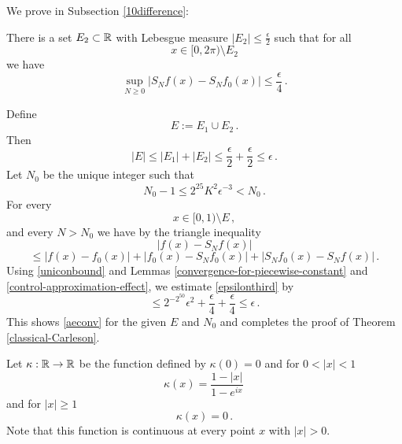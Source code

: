 {We prove in Subsection \ref{10difference}:
\begin{lemma}
\label{control-approximation-effect}
    There is a set $E_2 \subset {\mathbb{R}}$ with Lebesgue measure
    $|E_2|\le \frac \epsilon 2$ such that for all
    \begin{equation}
        x\in [0,2\pi)\setminus E_2
    \end{equation}
   we have
    \begin{equation}
    \label{eq-max-partial-sum-diff}
        \sup_{N\ge 0} |S_Nf(x)-S_Nf_0(x)|
        \le \frac \epsilon 4\,.
    \end{equation}
\end{lemma}

Define
\begin{equation}
    E:=E_1\cup E_2\, .
\end{equation}
Then
\begin{equation}
    |E|\le |E_1|+|E_2|\le \frac \epsilon 2 +\frac \epsilon 2 \le \epsilon\, .
\end{equation}
Let $N_0$ be the unique integer such that
\begin{equation}
    N_0- 1\le {2^{25} K^2}{\epsilon ^{-3}}<N_0\, .
\end{equation}
For every
\begin{equation}
x\in [0,1)\setminus E\, ,
\end{equation}
and every $N>N_0$ we have by the triangle inequality
\begin{equation*}
    |f(x)-S_Nf(x)|
    \end{equation*}
    \begin{equation}\label{epsilonthird}
    \le |f(x)-f_0(x)|+ |f_0(x)-S_Nf_0(x)|+|S_Nf_0(x)-S_N f(x)|\, .
\end{equation}
Using \eqref{uniconbound} and Lemmas \ref{convergence-for-piecewise-constant}
and \ref{control-approximation-effect}, we estimate \eqref{epsilonthird} by
\begin{equation}
    \le 2^{-2^{50}} \epsilon^2 +\frac \epsilon 4 +\frac \epsilon 4\le \epsilon\, .
\end{equation}
This shows  \eqref{aeconv} for the given $E$ and $N_0$
and completes the proof of Theorem \ref{classical-Carleson}.


Let  $\kappa:{\mathbb{R}}\to {\mathbb{R}}$ be the function defined by
$\kappa(0)=0$ and for $0<|x|<1$
\begin{equation}\label{eq-hilker}
\kappa(x)=\frac { 1-|x|}{1-e^{ix}}\,
\end{equation}
and for $|x|\ge 1$
\begin{equation}\label{eq-hilker1}
\kappa(x)=0\, .
\end{equation}
Note that this function is continuous at every point $x$ with $|x|>0$.

}
